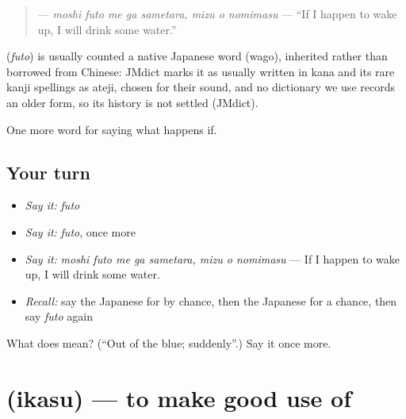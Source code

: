 \begin{quote}
\textbf{    } — \emph{moshi futo me ga sametara, mizu o nomimasu} — \textquotedblleft{}If I happen to wake up, I will drink some water.\textquotedblright{}
\end{quote}

\begin{cousinweb}
\textbf{} (\emph{futo}) is usually counted a native Japanese word (wago), inherited rather than borrowed from Chinese: JMdict marks it as usually written in kana and its rare kanji spellings as ateji, chosen for their sound, and no dictionary we use records an older form, so its history is not settled (JMdict).
\end{cousinweb}

\begin{grammarlens}[title={What you've built}]
One more word for saying what happens if.
\end{grammarlens}

\subsection*{Your turn}
\begin{itemize}
\raggedright
  \item \emph{Say it:} \emph{futo}
  \item \emph{Say it:} \emph{futo}, once more
  \item \emph{Say it:} \emph{moshi futo me ga sametara, mizu o nomimasu} — If I happen to wake up, I will drink some water.
  \item \emph{Recall:} say the Japanese for by chance, then the Japanese for a chance, then say \emph{futo} again
\end{itemize}

\begin{tcolorbox}[breakable,colback=teal!4,colframe=teal!35!black,title={Before you move on}]
What does  mean? (\textquotedblleft{}Out of the blue; suddenly\textquotedblright{}.) Say it once more.
\end{tcolorbox}
\section[\texorpdfstring{\ja{いかす} (ikasu)}{いかす (ikasu)}]{ (ikasu) — to make good use of}

\label{lesson:JA-C510-ikasu}



